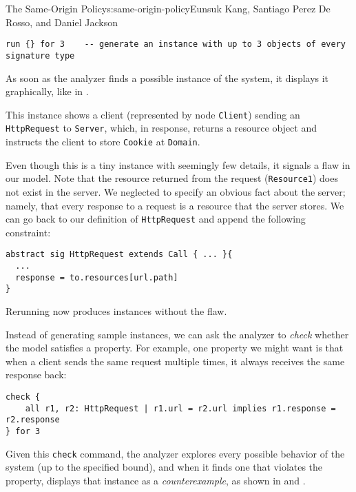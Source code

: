 \begin{aosachapter}{The Same-Origin Policy}{s:same-origin-policy}{Eunsuk Kang, Santiago Perez De Rosso, and Daniel Jackson}
\begin{verbatim}
run {} for 3    -- generate an instance with up to 3 objects of every signature type
\end{verbatim}

As soon as the analyzer finds a possible instance of the system, it
displays it graphically, like in
.


This instance shows a client (represented by node \texttt{Client})
sending an \texttt{HttpRequest} to \texttt{Server}, which, in response,
returns a resource object and instructs the client to store
\texttt{Cookie} at \texttt{Domain}.

Even though this is a tiny instance with seemingly few details, it
signals a flaw in our model. Note that the resource returned from the
request (\texttt{Resource1}) does not exist in the server. We neglected
to specify an obvious fact about the server; namely, that every response
to a request is a resource that the server stores. We can go back to our
definition of \texttt{HttpRequest} and append the following constraint:

\begin{verbatim}
abstract sig HttpRequest extends Call { ... }{
  ...
  response = to.resources[url.path]
}
\end{verbatim}

Rerunning now produces instances without the flaw.

Instead of generating sample instances, we can ask the analyzer to
\emph{check} whether the model satisfies a property. For example, one
property we might want is that when a client sends the same request
multiple times, it always receives the same response back:

\begin{verbatim}
check { 
    all r1, r2: HttpRequest | r1.url = r2.url implies r1.response = r2.response 
} for 3 
\end{verbatim}

Given this \texttt{check} command, the analyzer explores every possible
behavior of the system (up to the specified bound), and when it finds
one that violates the property, displays that instance as a
\emph{counterexample}, as shown in
 and
.


\end{aosachapter}
